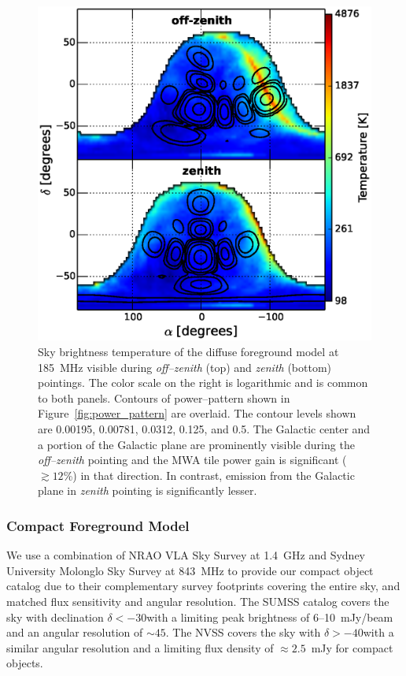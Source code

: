 \documentclass[preprint2,iop,numberedappendix]{emulateapj}
\begin{document}
\begin{figure}[htb]
\centering
\includegraphics[width=\linewidth]{figures/v1_0/dsm.eps}
\caption{Sky brightness temperature of the diffuse foreground model at 185~MHz visible during {\it off--zenith} (top) and {\it zenith} (bottom) pointings. The color scale on the right is logarithmic and is common to both panels. Contours of power--pattern shown in Figure~\ref{fig:power_pattern} are overlaid. The contour levels shown are 0.00195, 0.00781, 0.0312, 0.125, and 0.5. The Galactic center and a portion of the Galactic plane are prominently visible during the {\it off--zenith} pointing and the MWA tile power gain is significant ($\gtrsim 12$\%) in that direction. In contrast, emission from the Galactic plane in {\it zenith} pointing is significantly lesser. \label{fig:DSM}}
\end{figure}

\subsubsection{Compact Foreground Model}\label{sec:CSM}

We use a combination of NRAO VLA Sky Survey \citep[NVSS;][]{con98} at 1.4~GHz and Sydney University Molonglo Sky Survey \citep[SUMSS;][]{boc99,mau03} at 843~MHz to provide our compact object catalog due to their complementary survey footprints covering the entire sky, and matched flux sensitivity and angular resolution. The SUMSS catalog covers the sky with declination $\delta < -30$\arcdeg with a limiting peak brightness of 6--10~mJy/beam and an angular resolution of $\sim 45$\arcsec. The NVSS covers the sky with $\delta > -40$\arcdeg with a similar angular resolution and a limiting flux density of $\approx 2.5$~mJy for compact objects. 
\end{document}
